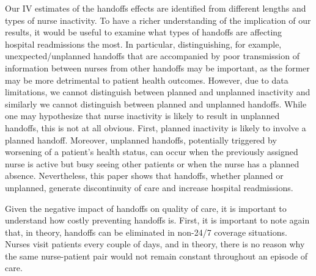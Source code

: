 \documentclass[final,12pt, notitlepage]{article}
\begin{document}
Our IV estimates of the handoffs effects are identified from different lengths and types of nurse inactivity. To have a richer understanding of the implication of our results, it would be useful to examine what types of handoffs are affecting hospital readmissions the most. In particular, distinguishing, for example, unexpected/unplanned handoffs that are accompanied by poor transmission of information between nurses from other handoffs may be important, as the former may be more detrimental to patient health outcomes. However, due to data limitations, we cannot distinguish between planned and unplanned inactivity and similarly we cannot distinguish between planned and unplanned handoffs. While one may hypothesize that nurse inactivity is likely to result in unplanned handoffs, this is not at all obvious. First, planned inactivity is likely to involve a planned handoff. Moreover, unplanned handoffs, potentially triggered by worsening of a patient's health status, can occur when the previously assigned nurse is active but busy seeing other patients or when the nurse has a planned absence. Nevertheless, this paper shows that handoffs, whether planned or unplanned, generate discontinuity of care and increase hospital readmissions.

Given the negative impact of handoffs on quality of care, it is important to understand how costly preventing handoffs is. First, it is important to note again that, in theory, handoffs can be eliminated in non-24/7 coverage situations. Nurses visit patients every couple of days, and in theory, there is no reason why the same nurse-patient pair would not remain constant throughout an episode of care. 
\end{document}
